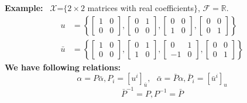 \documentclass[letterpaper]{article}
\begin{document}
\noindent \textbf{Example:}~ $\mathcal{X}$=$\{2\times2$ matrices with real coefficients$\}$, $\mathcal{F}=\mathbb{R}$.
    \begin{align*}
        u&=\left\{ \left[\begin{array}{cc}
            1 & 0\\
            0 & 0
            \end{array}\right],\left[\begin{array}{cc}
            0 & 1\\
            0 & 0
            \end{array}\right],\left[\begin{array}{cc}
            0 & 0\\
            1 & 0
            \end{array}\right],\left[\begin{array}{cc}
            0 & 0\\
            0 & 1
            \end{array}\right]\right\}\\
        \bar{u}&=\left\{ \left[\begin{array}{cc}
            1 & 0\\
            0 & 0
            \end{array}\right],\left[\begin{array}{cc}
            0 & 1\\
            1 & 0
            \end{array}\right],\left[\begin{array}{cc}
            0 & 1\\
            -1 & 0
            \end{array}\right],\left[\begin{array}{cc}
            0 & 0\\
            0 & 1
        \end{array}\right]\right\}
    \end{align*}
   \textbf{ We have following relations:}
    \newline
    $$\alpha=P\bar{\alpha}, P_i=[u^i]_{\bar{u}},~~~ \bar{\alpha}=\bar{P}\alpha, \bar{P}_i=[\bar{u}^i]_u$$ 
    $$\bar{P}^{-1}=P, P^{-1}=\bar{P}$$
    \newline
    
\end{document}
